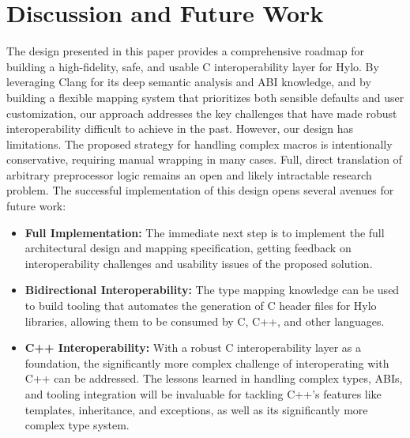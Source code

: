 \section{Discussion and Future Work}

The design presented in this paper provides a comprehensive roadmap for building a high-fidelity, safe, and usable C interoperability layer for Hylo. By leveraging Clang for its deep semantic analysis and ABI knowledge, and by building a flexible mapping system that prioritizes both sensible defaults and user customization, our approach addresses the key challenges that have made robust interoperability difficult to achieve in the past.
However, our design has limitations. The proposed strategy for handling complex macros is intentionally conservative, requiring manual wrapping in many cases. Full, direct translation of arbitrary preprocessor logic remains an open and likely intractable research problem.
The successful implementation of this design opens several avenues for future work:

\begin{itemize}
    \item \textbf{Full Implementation:} The immediate next step is to implement the full architectural design and mapping specification, getting feedback on interoperability challenges and usability issues of the proposed solution.
    \item \textbf{Bidirectional Interoperability:} The type mapping knowledge can be used to build tooling that automates the generation of C header files for Hylo libraries, allowing them to be consumed by C, C++, and other languages.
    \item \textbf{C++ Interoperability:} With a robust C interoperability layer as a foundation, the significantly more complex challenge of interoperating with C++ can be addressed. The lessons learned in handling complex types, ABIs, and tooling integration will be invaluable for tackling C++'s features like templates, inheritance, and exceptions, as well as its significantly more complex type system.
\end{itemize}